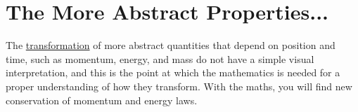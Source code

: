 
\section{The More Abstract Properties...}%

The \hyperlink{def-transform}{transformation} of more abstract quantities that depend on position and time, such as momentum, energy, and mass do not have a simple visual interpretation, and this is the point at which the mathematics is needed for a proper understanding of how they transform. With the maths, you will find new conservation of momentum and energy laws.






